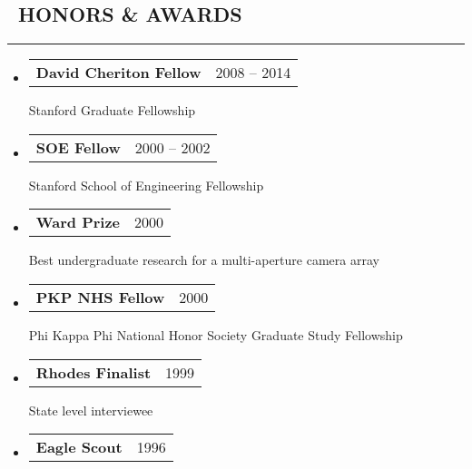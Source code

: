 \documentclass[10pt,letterpaper]{article}
\makeatletter
\newenvironment{resumesection}[1]
{%
    \subsection*{\ \textcolor{light-gray}{#1} }
    \vspace{-0.4em}
    \begin{samepage}
    \hrule
    \end{samepage}
    \vspace{+0.4em}
    \begin{itemize}[leftmargin=0.15cm]
        \parskip=0.1em
}%
{%
    \end{itemize}
}%
\newcommand{\headerrowx}[2]
{\item[] \begin{tabular*}{\linewidth}{l@{\extracolsep{\fill}}r}
	#1 &
	#2 \\
\end{tabular*}}
\newcommand{\lminiw}{0.375}
\newcommand{\cminiw}{0.075}
\makeatother
\begin{document}
\begin{minipage}[t]{\lminiw\textwidth}
\begin{resumesection}{HONORS \& AWARDS}
    \headerrowx{\textbf{David Cheriton Fellow}}{2008 -- 2014}
    
    Stanford Graduate Fellowship
    
    \headerrowx{\textbf{SOE Fellow}}{2000 -- 2002}
    
    Stanford School of Engineering Fellowship
    
    \headerrowx{\textbf{Ward Prize}}{2000}
    
    Best undergraduate research for a multi-aperture camera array
    
    \headerrowx{\textbf{PKP NHS Fellow}}{2000}
    
    Phi Kappa Phi National Honor Society Graduate Study Fellowship
    
    \headerrowx{\textbf{Rhodes Finalist}}{1999}
    
    State level interviewee
    
    \headerrowx{\textbf{Eagle Scout}}                       {1996}
\end{resumesection}

\end{minipage}
\begin{minipage}[t]{\cminiw\textwidth}
\end{minipage}\hfill
\end{document}
